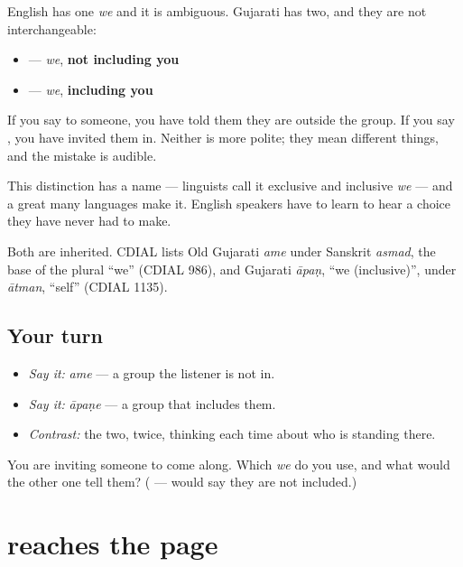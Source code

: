 \begin{cousinweb}
English has one \emph{we} and it is ambiguous. Gujarati has two, and they are not interchangeable:

\begin{itemize}
\raggedright
  \item \textbf{} — \emph{we}, \textbf{not including you}
  \item \textbf{} — \emph{we}, \textbf{including you}
\end{itemize}

If you say \textbf{} to someone, you have told them they are outside the group. If you say \textbf{}, you have invited them in. Neither is more polite; they mean different things, and the mistake is audible.

This distinction has a name — linguists call it exclusive and inclusive \emph{we} — and a great many languages make it. English speakers have to learn to hear a choice they have never had to make.

Both are inherited. CDIAL lists Old Gujarati \emph{ame} under Sanskrit \emph{asmad}, the base of the plural \textquotedblleft{}we\textquotedblright{} (CDIAL 986), and Gujarati \emph{āpaṇ}, \textquotedblleft{}we (inclusive)\textquotedblright{}, under \emph{ātman}, \textquotedblleft{}self\textquotedblright{} (CDIAL 1135).
\end{cousinweb}

\subsection*{Your turn}
\begin{itemize}
\raggedright
  \item \emph{Say it:} \emph{ame} — a group the listener is not in.
  \item \emph{Say it:} \emph{āpaṇe} — a group that includes them.
  \item \emph{Contrast:} the two, twice, thinking each time about who is standing there.
\end{itemize}

\begin{tcolorbox}[breakable,colback=teal!4,colframe=teal!35!black,title={Before you move on}]
You are inviting someone to come along. Which \emph{we} do you use, and what would the other one tell them? (\textbf{} — \textbf{} would say they are not included.)
\end{tcolorbox}
\section[\texorpdfstring{\gu{તે} (te)}{તે (te)}]{ reaches the page}

